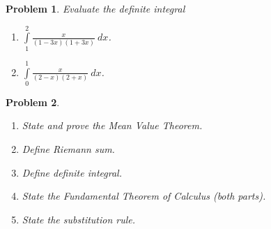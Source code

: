 \documentclass{article}
\newtheorem{problem}{Problem}
\begin{document}
\begin{problem}
Evaluate the definite integral 
\begin{enumerate}
\item $\int\limits_{1}^{2} \frac{x}{(1-3x)(1+3x) }  ~dx$.
\item $\int\limits_{0}^1 \frac{x}{(2-x)(2+x) }  ~dx$.
\end{enumerate}
\end{problem}
\begin{problem}~
\begin{enumerate}
\item State and prove the Mean Value Theorem.
\item Define Riemann sum.
\item Define definite integral.
\item State the Fundamental Theorem of Calculus (both parts).
\item State the substitution rule.
\end{enumerate}
\end{problem}
\end{document}
